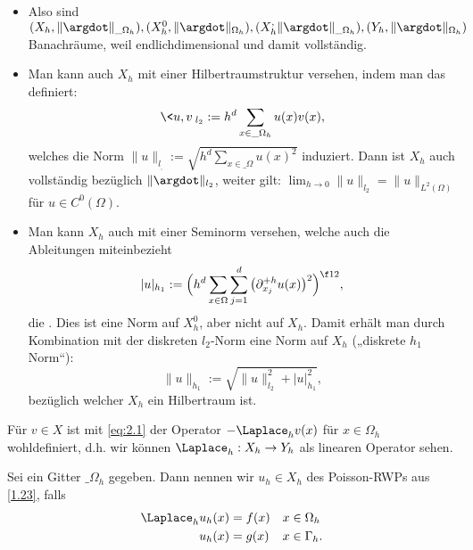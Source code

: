 \begin{nt*}[Nebenbemerkungen]
	\begin{itemize}
		\item
			Also sind $(X_h, \|\argdot\|_{\_\Omega_h}), (X_h^0, \|\argdot\|_{\Omega_h}), (X_h^ , \|\argdot\|_{\_\Omega_h}), (Y_h, \|\argdot\|_{\Omega_h})$ Banachräume, weil endlichdimensional und damit vollständig.
		\item
			Man kann auch $X_h$ mit einer Hilbertraumstruktur versehen, indem man das  definiert:
			\[
				\<u,v\>_{l_2} := h^d \sum_{x\in\_\Omega_h} u(x) v(x),
			\]
			welches die Norm $\|u\|_{l_,} := \sqrt{h^d \sum_{x\in\_\Omega} u(x)^2}$ induziert.
			Dann ist $X_h$ auch vollständig bezüglich $\|\argdot\|_{l_2}$, weiter gilt: $\lim_{h\to 0} \|u\|_{l_2} = \|u\|_{L^2(\Omega)}$ für $u \in C^0(\Omega)$.
		\item
			Man kann $X_h$ auch mit einer Seminorm versehen, welche auch die Ableitungen miteinbezieht
			\[
				|u|_{h_1}
				:= \Big( h^d \sum_{x\in\Omega} \sum_{j=1}^d  \big(\partial_{x_j}^{+h} u(x)\big)^2 \Big)^{\f 12},
			\]
			die .
			Dies ist eine Norm auf $X_h^0$, aber nicht auf $X_h$.
			Damit erhält man durch Kombination mit der diskreten $l_2$-Norm eine Norm auf $X_h$ („diskrete $h_1$ Norm“):
			\[
				\|u\|_{h_1}
				:= \sqrt{\|u\|_{l_2}^2 + |u|_{h_1}^2},
			\]
			bezüglich welcher $X_h$ ein Hilbertraum ist.
	\end{itemize}
\end{nt*}

Für $v \in X$ ist mit \eqref{eq:2.1} der Operator $-\Laplace_h v(x)$ für $x \in \Omega_h$ wohldefiniert, d.h. wir können $\Laplace_h : X_h \to Y_h$ als linearen Operator sehen.

\begin{df} \label{2.7}
	Sei ein Gitter $\_\Omega_h$ gegeben.
	Dann nennen wir $u_h \in X_h$  des Poisson-RWPs aus \ref{1.23}, falls
	\begin{align} \label{eq:2.2}
		\Laplace_h u_h(x) &= f(x) && \text{$x \in \Omega_h$} \\
		u_h(x) &= g(x) && \text{$x\in \Gamma_h$}.
	\end{align}
\end{df}

